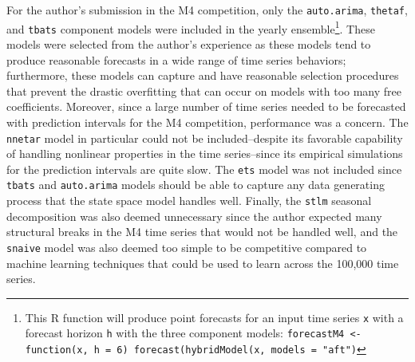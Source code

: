 \documentclass[11pt,3p,review,authoryear]{elsarticle}
\begin{document}
For the author's submission in the M4 competition, only the \texttt{auto.arima}, \texttt{thetaf}, and \texttt{tbats} component models were included in the yearly ensemble\footnote{This R function will produce point forecasts for an input time series \texttt{x} with a forecast horizon \texttt{h} with the three component models: \texttt{forecastM4 <- function(x, h = 6) forecast(hybridModel(x, models = "aft")}}. These models were selected from the author's experience as these models tend to produce reasonable forecasts in a wide range of time series behaviors; furthermore, these models can capture and have reasonable selection procedures that prevent the drastic overfitting that can occur on models with too many free coefficients. Moreover, since a large number of time series needed to be forecasted with prediction intervals for the M4 competition, performance was a concern. The \texttt{nnetar} model in particular could not be included--despite its favorable capability of handling nonlinear properties in the time series--since its empirical simulations for the prediction intervals are quite slow. The \texttt{ets} model was not included since \texttt{tbats} and \texttt{auto.arima} models should be able to capture any data generating process that the state space model handles well. Finally, the \texttt{stlm} seasonal decomposition was also deemed unnecessary since the author expected many structural breaks in the M4 time series that would not be handled well, and the \texttt{snaive} model was also deemed too simple to be competitive compared to machine learning techniques that could be used to learn across the 100,000 time series.
\end{document}
